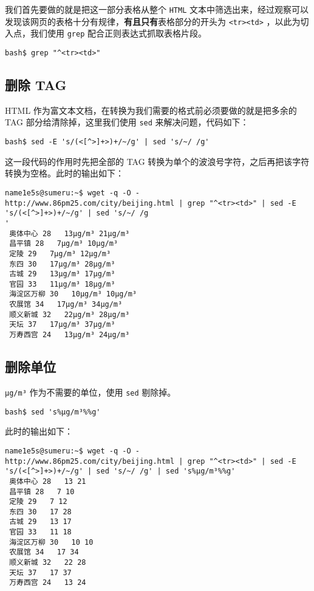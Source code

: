 \documentclass[blue,normal,cn]{elegantnote}
\newcommand{\code}[1]{\colorbox{light-gray}{\texttt{#1}}}
\begin{document}
我们首先要做的就是把这一部分表格从整个 \code{HTML} 文本中筛选出来，经过观察可以发现该网页的表格十分有规律，\textbf{有且只有}表格部分的开头为 \code{<tr><td>} ，以此为切入点，我们使用 \code{grep} 配合正则表达式抓取表格片段。

\begin{lstlisting}
bash$ grep "^<tr><td>"
\end{lstlisting}

\subsection{删除 TAG}

HTML 作为富文本文档，在转换为我们需要的格式前必须要做的就是把多余的 TAG 部分给清除掉，这里我们使用 \code{sed} 来解决问题，代码如下：

\begin{lstlisting}
bash$ sed -E 's/(<[^>]+>)+/~/g' | sed 's/~/ /g'
\end{lstlisting}

这一段代码的作用时先把全部的 TAG 转换为单个的波浪号字符，之后再把该字符转换为空格。此时的输出如下：

\begin{lstlisting}
name1e5s@sumeru:~$ wget -q -O -  http://www.86pm25.com/city/beijing.html | grep "^<tr><td>" | sed -E 's/(<[^>]+>)+/~/g' | sed 's/~/ /g
'
 奥体中心 28   13μg/m³ 21μg/m³
 昌平镇 28   7μg/m³ 10μg/m³
 定陵 29   7μg/m³ 12μg/m³
 东四 30   17μg/m³ 28μg/m³
 古城 29   13μg/m³ 17μg/m³
 官园 33   11μg/m³ 18μg/m³
 海淀区万柳 30   10μg/m³ 10μg/m³
 农展馆 34   17μg/m³ 34μg/m³
 顺义新城 32   22μg/m³ 28μg/m³
 天坛 37   17μg/m³ 37μg/m³
 万寿西宫 24   13μg/m³ 24μg/m³
\end{lstlisting}

\subsection{删除单位}

\code{μg/m³} 作为不需要的单位，使用 \code{sed} 剔除掉。

\begin{lstlisting}
bash$ sed 's%μg/m³%%g'
\end{lstlisting}

此时的输出如下：

\begin{lstlisting}
name1e5s@sumeru:~$ wget -q -O -  http://www.86pm25.com/city/beijing.html | grep "^<tr><td>" | sed -E 's/(<[^>]+>)+/~/g' | sed 's/~/ /g' | sed 's%μg/m³%%g'
 奥体中心 28   13 21
 昌平镇 28   7 10
 定陵 29   7 12
 东四 30   17 28
 古城 29   13 17
 官园 33   11 18
 海淀区万柳 30   10 10
 农展馆 34   17 34
 顺义新城 32   22 28
 天坛 37   17 37
 万寿西宫 24   13 24
\end{lstlisting}
\end{document}
